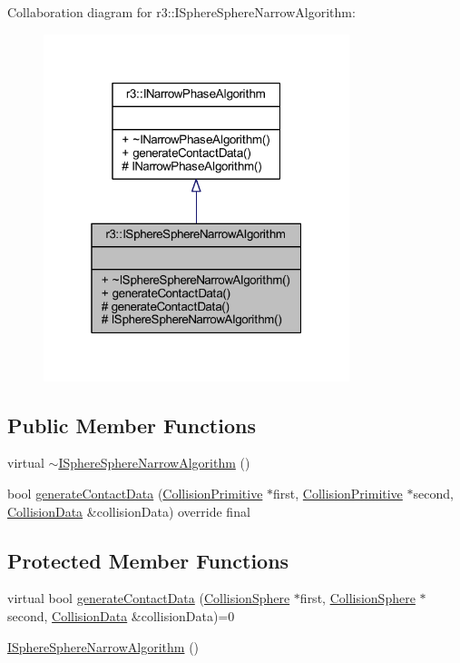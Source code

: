 Collaboration diagram for r3\+:\+:I\+Sphere\+Sphere\+Narrow\+Algorithm\+:\nopagebreak
\begin{figure}[H]
\begin{center}
\leavevmode
\includegraphics[width=253pt]{classr3_1_1_i_sphere_sphere_narrow_algorithm__coll__graph}
\end{center}
\end{figure}
\subsection*{Public Member Functions}
\begin{DoxyCompactItemize}
\item 
virtual \mbox{\hyperlink{classr3_1_1_i_sphere_sphere_narrow_algorithm_af1abc65f80b07e3af1d3b1c69d6b5db0}{$\sim$\+I\+Sphere\+Sphere\+Narrow\+Algorithm}} ()
\item 
bool \mbox{\hyperlink{classr3_1_1_i_sphere_sphere_narrow_algorithm_aa8b2e8c92116966ffc43857a53c813cb}{generate\+Contact\+Data}} (\mbox{\hyperlink{classr3_1_1_collision_primitive}{Collision\+Primitive}} $\ast$first, \mbox{\hyperlink{classr3_1_1_collision_primitive}{Collision\+Primitive}} $\ast$second, \mbox{\hyperlink{classr3_1_1_collision_data}{Collision\+Data}} \&collision\+Data) override final
\end{DoxyCompactItemize}
\subsection*{Protected Member Functions}
\begin{DoxyCompactItemize}
\item 
virtual bool \mbox{\hyperlink{classr3_1_1_i_sphere_sphere_narrow_algorithm_a8e9aeb408279b3f1716cdbbd7ae75f3f}{generate\+Contact\+Data}} (\mbox{\hyperlink{classr3_1_1_collision_sphere}{Collision\+Sphere}} $\ast$first, \mbox{\hyperlink{classr3_1_1_collision_sphere}{Collision\+Sphere}} $\ast$second, \mbox{\hyperlink{classr3_1_1_collision_data}{Collision\+Data}} \&collision\+Data)=0
\item 
\mbox{\hyperlink{classr3_1_1_i_sphere_sphere_narrow_algorithm_ac7efae14951096a647a7d037f275d75b}{I\+Sphere\+Sphere\+Narrow\+Algorithm}} ()
\end{DoxyCompactItemize}



